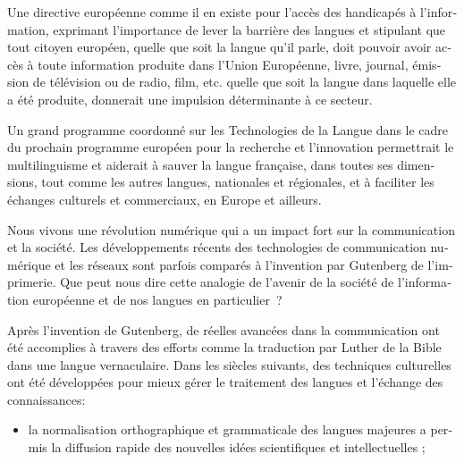 \begin{french}
\begin{multicols}{2}
Une directive européenne comme il en existe pour l’accès des handicapés à l’information, exprimant l’importance de lever la barrière des langues et stipulant que tout citoyen européen, quelle que soit la langue qu’il parle, doit pouvoir avoir accès à toute information produite dans l’Union Européenne, livre, journal, émission de télévision ou de radio, film, etc. quelle que soit la langue dans laquelle elle a été produite, donnerait une impulsion déterminante à ce secteur.

Un grand programme coordonné sur les Technologies de la Langue dans le cadre du prochain programme européen pour la recherche et l’innovation permettrait le multilinguisme et aiderait à sauver la langue française, dans toutes ses dimensions, tout comme les autres langues, nationales et régionales, et à faciliter les échanges culturels et commerciaux, en Europe et ailleurs.
\end{multicols}

\clearpage


\begin{multicols}{2}

Nous vivons une révolution numérique qui a un impact fort
sur la communication et la société. Les développements récents des
technologies de communication numérique et les réseaux sont parfois
comparés à l'invention par Gutenberg de l'imprimerie. Que peut nous
dire cette analogie de l'avenir de la société de l'information
européenne et de nos langues en particulier~?


Après l'invention de Gutenberg, de réelles avancées dans la
communication ont été accomplies à travers des efforts comme la
traduction par Luther de la Bible dans une langue vernaculaire. Dans
les siècles suivants, des techniques culturelles ont été développées
pour mieux gérer le traitement des langues et l'échange des
connaissances:

\begin{itemize}

\item la normalisation orthographique et grammaticale des langues
  majeures a permis la diffusion rapide des nouvelles idées
  scientifiques et intellectuelles ;


\end{itemize}
\end{multicols}
\end{french}

